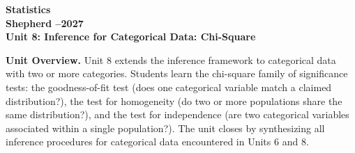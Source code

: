 \documentclass[10pt]{article}
\begin{document}
\vspace{-1.3in}

\begin{center}
  {\color{white}\bfseries\fontsize{24}{30}\selectfont Statistics}\\[5pt]
  {\color{goldacc}\bfseries\large Shepherd --2027}\\[10pt]
  {\color{white}\bfseries\Large Unit 8: Inference for Categorical Data: Chi-Square}\\[3pt]
\end{center}

\vspace{0.18in}

\begin{tcolorbox}[colback=sky,colframe=navy,boxrule=0.9pt,arc=2mm,
    left=4mm,right=4mm,top=2mm,bottom=2mm]
  \small\textbf{Unit Overview.}\quad
  Unit 8 extends the inference framework to categorical data with two or more categories.
  Students learn the chi-square family of significance tests: the goodness-of-fit test
  (does one categorical variable match a claimed distribution?), the test for homogeneity
  (do two or more populations share the same distribution?), and the test for independence
  (are two categorical variables associated within a single population?). The unit closes
  by synthesizing all inference procedures for categorical data encountered in Units 6
  and 8.
\end{tcolorbox}

\vspace{0.14in}
\end{document}
